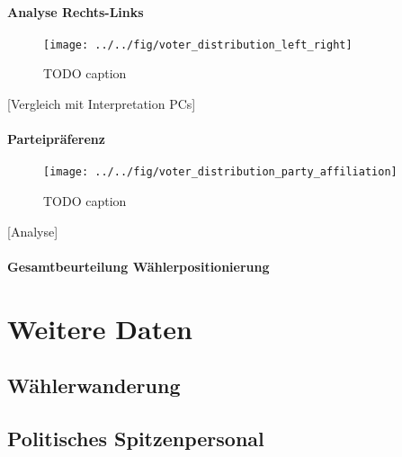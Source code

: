 \paragraph{Analyse Rechts-Links}
\begin{figure}[htb]
	\centering
	\texttt{[image: ../../fig/voter\_distribution\_left\_right]}
	\caption{TODO caption}
	\label{fig:voter-positions-pca-left-right}
\end{figure}
[Vergleich mit Interpretation PCs]

\paragraph{Parteipräferenz}
\begin{figure}[htb]
	\centering
	\texttt{[image: ../../fig/voter\_distribution\_party\_affiliation]}
	\caption{TODO caption}
	\label{fig:voter-positions-pca-party-affiliation}
\end{figure}
[Analyse]

\paragraph{Gesamtbeurteilung Wählerpositionierung}


\section{Weitere Daten}\label{Sec-Weitere-Daten}

\subsection{Wählerwanderung}\label{Sec-Wählerwanderung}

\subsection{Politisches Spitzenpersonal}\label{Sec-Spitzenpersonal}
